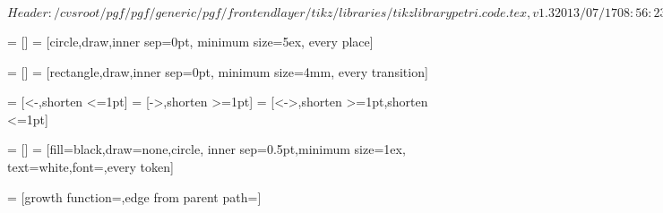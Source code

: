 %
%
%

\ProvidesFileRCS[v\pgfversion] $Header: /cvsroot/pgf/pgf/generic/pgf/frontendlayer/tikz/libraries/tikzlibrarypetri.code.tex,v 1.3 2013/07/17 08:56:23 tantau Exp $



=           []%
=                 [circle,draw,inner sep=0pt,
                                    minimum size=5ex,
                                    every place]%



=      []%
=            [rectangle,draw,inner sep=0pt,
                                    minimum size=4mm,
                                    every transition]%



=                   [<-,shorten <=1pt]%
=                  [->,shorten >=1pt]%
=          [<->,shorten >=1pt,shorten <=1pt]%




=           []%
=                 [fill=black,draw=none,circle,
                                    inner sep=0.5pt,minimum size=1ex,
                                    text=white,font=\pgfutil@font@tiny,every token]%

%
\def\tikz@token@distance{1.5ex}%

=   [growth function=\tikz@grow@tokens,edge from parent path=]%

%

%

%


